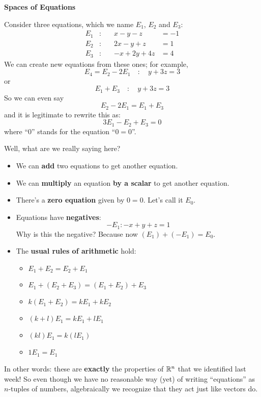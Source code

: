 \begin{myexample} {\bf Spaces of Equations}

Consider three equations, which we name $E_1$, $E_2$ and $E_3$:
\begin{align*}
E_1 &: \quad  &x-y-z &= -1 \\
E_2 &: \quad &2x-y+z &= 1\\
E_3 &: \quad &-x+2y+4z &=4
\end{align*}
We can create new equations from these ones; for example,
$$
E_4 = E_2-2E_1 \quad : \quad y+3z=3
$$
or
$$
E_1 + E_3 \quad : \quad y+3z = 3
$$
So we can even say
$$
E_2-2E_1 = E_1 + E_3
$$
and it is legitimate to rewrite this as:
$$
3E_1 -E_2 + E_3 = 0
$$
where ``0'' stands for the equation ``$0=0$''.

Well, what are we really saying here?
\begin{itemize}
\item We can {\bf add} two equations to get another equation.
\item We can {\bf multiply} an equation {\bf by a scalar} to get
another equation.
\item There's a {\bf zero equation} given by $0=0$.  Let's call it
$E_0$.
\item Equations have {\bf negatives}:
$$
-E_1 : -x+y+z=1
$$
Why is this the negative?  Because now $(E_1) + (-E_1) = E_0$.
\item The {\bf usual rules of arithmetic} hold:
\begin{itemize}
\item $E_1 + E_2 = E_2+E_1$
\item $E_1 + (E_2+E_3) = (E_1 + E_2) + E_3$
\item $k(E_1+E_2) = kE_1+kE_2$
\item $(k+l)E_1 = kE_1 + lE_1$
\item $(kl)E_1 = k(lE_1)$
\item $1 E_1 = E_1$
\end{itemize}
\end{itemize}


In other words:  these are {\bf exactly} the properties of $\mathbb{R}^n$
that we identified last week!  So even though we have no reasonable
way (yet) of writing ``equations'' as $n$-tuples of numbers, 
algebraically we recognize that they act just like vectors do.
\end{myexample}

 


